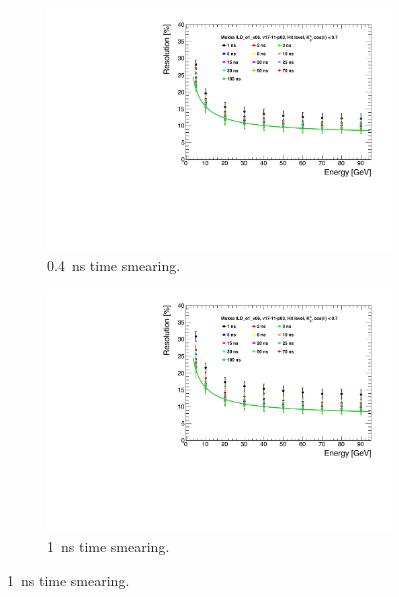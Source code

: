 \begin{figure}[t]
  \centering
  \begin{minipage}{1\textwidth}
    \begin{subfigure}[t]{0.5\textwidth}
      \centering
      \includegraphics[width=1\linewidth]{chap6/fig_TimingILD/0.4ns_Smearing/ShowerResoAbsolute_TimeCuts_Smearing0.4ns}
      \caption{\SI{0.4}{\nano\second} time smearing.} \label{fig:Reso0.4ns}
    \end{subfigure}
    \begin{subfigure}[t]{0.5\textwidth}
      \centering
      \includegraphics[width=1\linewidth]{chap6/fig_TimingILD/1ns_Smearing/ShowerResoAbsolute_TimeCuts_Smearing1ns}
      \caption{\SI{1}{\nano\second} time smearing.} \label{fig:Reso1ns}
    \end{subfigure}

\end{minipage}
\end{figure}
